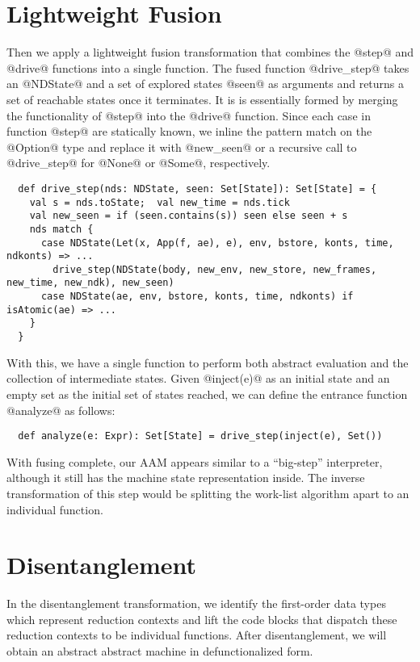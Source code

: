 \documentclass[acmsmall, review]{acmart}\settopmatter{}
\begin{document}
\section{Lightweight Fusion} \label{fusing}

Then we apply a lightweight fusion transformation that combines the @step@ and @drive@
functions into a single function.
The fused function @drive_step@ takes an @NDState@ and a set of explored states @seen@ 
as arguments and returns a set of reachable states once it terminates.
It is is essentially formed by merging the functionality of @step@ into the @drive@ function.
Since each case in function @step@ are statically known, we inline the pattern match on the
@Option@ type and replace it with @new_seen@ or a recursive call to @drive_step@ for @None@
or @Some@, respectively.

\begin{lstlisting}
  def drive_step(nds: NDState, seen: Set[State]): Set[State] = {
    val s = nds.toState;  val new_time = nds.tick
    val new_seen = if (seen.contains(s)) seen else seen + s
    nds match {
      case NDState(Let(x, App(f, ae), e), env, bstore, konts, time, ndkonts) => ...
        drive_step(NDState(body, new_env, new_store, new_frames, new_time, new_ndk), new_seen)
      case NDState(ae, env, bstore, konts, time, ndkonts) if isAtomic(ae) => ...
    }
  }
\end{lstlisting}

With this, we have a single function to perform both abstract evaluation and the collection of
intermediate states. Given @inject(e)@ as an initial state and an empty set as the
initial set of states reached, we can define the entrance function @analyze@ as follows:

\begin{lstlisting}
  def analyze(e: Expr): Set[State] = drive_step(inject(e), Set())
\end{lstlisting}

With fusing complete, our AAM appears similar to a ``big-step'' interpreter, although it
still has the machine state representation inside. The inverse transformation of this step
would be splitting the work-list algorithm apart to an individual function.

\section{Disentanglement} \label{disen}

In the disentanglement transformation, we identify the first-order data types which represent 
reduction contexts and lift the code blocks that dispatch these reduction contexts to be individual 
functions.
After disentanglement, we will obtain an abstract abstract machine in defunctionalized form.
\end{document}
